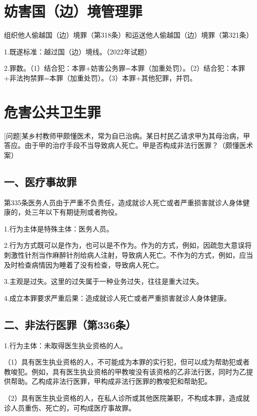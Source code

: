 \section{妨害国（边）境管理罪}

组织他人偷越国（边）境罪（第318条）和运送他人偷越国（边）境罪（第321条）

1.既遂标准：越过国（边）境线。（2022年试题）

2.罪数。（1）结合犯：本罪+妨害公务罪=本罪（加重处罚）。（2）结合犯：本罪+非法拘禁罪=本罪（加重处罚）。（3）本罪+其他犯罪，并罚。

\section{危害公共卫生罪}

[问题]某乡村教师甲颇懂医术，常为自已治病。某日村民乙请求甲为其母治病，甲答应。由于甲的治疗手段不当导致病人死亡。甲是否构成非法行医罪？（颇懂医术案）

\subsection*{一、医疗事故罪}

第335条医务人员由于严重不负责任，造成就诊人死亡或者严重损害就诊人身体健康的，处三年以下有期徒刑或者拘役。

1.行为主体是特殊主体：医务人员。

2.行为方式既可以是作为，也可以是不作为。作为的方式，例如，因疏忽大意误将刺激性针剂当作麻醉针剂给病人注射，导致病人死亡。不作为的方式，例如，应当及时检查病情因为睡着了没有检查，导致病人死亡。

3.主观是过失。这里的过失属于一种业务过失，往往是重大过失。

4.成立本罪要求严重后果：造成就诊人死亡或者严重损害就诊人身体健康。

\subsection*{二、非法行医罪（第336条）}

1.行为主体：未取得医生执业资格的人。

（1）具有医生执业资格的人，不可能成为本罪的实行犯，但可以成为帮助犯或者教唆犯。例如，具有医生执业资格的甲教唆没有该资格的乙非法行医，同时为乙提供帮助。乙构成非法行医罪，甲构成非法行医罪的教唆犯和帮助犯。

（2）具有医生执业资格的人，在私人诊所或其他医院兼职，不构成本罪，造成就诊人员重伤、死亡的，可构成医疗事故罪。

